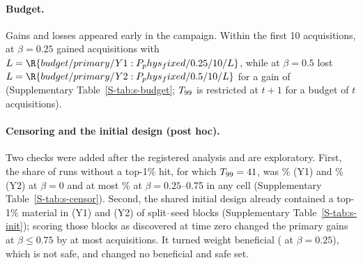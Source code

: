 \paragraph{Budget.} Gains and losses appeared early in the campaign. Within the first 10 acquisitions, \cellB{} at
$\beta=0.25$ gained  acquisitions with
$L=\R{budget/primary/Y1:P_phys_fixed/0.25/10/L}$, while \cellE{} at $\beta=0.5$ lost $L=\R{budget/primary/Y2:P_phys_fixed/0.5/10/L}$
for a gain of  (Supplementary Table~\ref{S-tab:s-budget}; $T_{99}$ is restricted at $t+1$
for a budget of $t$ acquisitions).

\paragraph{Censoring and the initial design (post hoc).} Two checks were added after the registered analysis and are
exploratory. First, the share of runs without a top-1\% hit, for which $T_{99}=41$, was \%
(Y1) and \% (Y2) at $\beta=0$ and at most
\% at $\beta=0.25$--0.75 in any cell (Supplementary Table~\ref{S-tab:s-censor}).
Second, the shared initial design already contained a top-1\% material in  (Y1) and
 (Y2) of  split--seed blocks (Supplementary Table~\ref{S-tab:s-init}); scoring those blocks as discovered
at time zero changed the primary gains at $\beta\le0.75$ by at most  acquisitions. It turned
 weight beneficial (\cellC{} at $\beta=0.25$), which is not safe, and changed no beneficial and
safe set.

